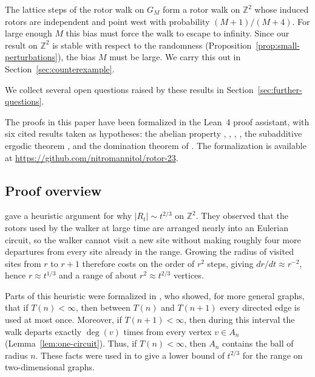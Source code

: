 \documentclass[11pt]{amsart}
\theoremstyle{plain}
\theoremstyle{definition}
\newcommand{\Z}{\mathbb Z}
\begin{document}
	The lattice steps of the rotor walk on $G_M$ form a rotor walk on $\Z^2$
	whose induced rotors are independent and point west with probability
	$(M+1)/(M+4)$.
	For large enough $M$ this bias must force the walk to escape
	to infinity.  Since our result on $\Z^2$ is stable with respect to the
	randomness (Proposition~\ref{prop:small-perturbations}), the bias $M$ must be
	large.  We carry this out in Section~\ref{sec:counterexample}. 
	
	\smallskip
	We collect several open questions raised by these results in
	Section~\ref{sec:further-questions}.

	\smallskip
	The proofs in this paper have been formalized in the Lean~4 proof
	assistant, with six cited results taken as hypotheses: the abelian property
	\citep[Lemma~3.9]{HolroydLevineMeszarosPeresProppWilson2008},
	\citet[Lemmas~2.1 and~2.4]{FlorescuLevinePeres2016},
	\citet[Lemma~6]{HolroydPropp2010}, \citet[Theorem~1]{AngelHolroyd2012},
	the subadditive ergodic theorem \citep{Kingman1968}, and the domination
	theorem of \citet[Theorem~0.0]{LiggettSchonmannStacey1997}.  The
	formalization is available at \url{https://github.com/nitromannitol/rotor-23}.
	
	\subsection{Proof overview}\label{ssec:proof-overview}
	
	\citet{PriezzhevDharDharKrishnamurthy1996} gave a heuristic argument for why
	$|R_t|\sim t^{2/3}$ on $\Z^2$.  They observed that the rotors used by the
	walker at large time are arranged nearly into an Eulerian circuit, so the
	walker cannot visit a new site without making roughly four more departures
	from every site already in the range.  Growing the radius of visited
	sites from $r$ to $r+1$ therefore costs on the order of $r^2$ steps, giving
	$dr/dt\approx r^{-2}$, hence $r\approx t^{1/3}$ and a range of about
	$r^2\approx t^{2/3}$ vertices.
	
	Parts of this heuristic were formalized in \citet{FlorescuLevinePeres2016},
	who showed, for more general graphs, that if $T(n)<\infty$, then between
	$T(n)$ and $T(n+1)$ every directed edge is used at most once.  Moreover, if
	$T(n+1)<\infty$, then during this interval the walk departs exactly
	$\deg(v)$ times from every vertex $v\in A_n$
	(Lemma~\ref{lem:one-circuit}).  Thus, if $T(n)<\infty$, then
	$A_n$ contains the ball of radius $n$.  These facts were used in
	\citet{FlorescuLevinePeres2016} to give a lower bound of $t^{2/3}$ for the
	range on two-dimensional graphs.
	
\end{document}
